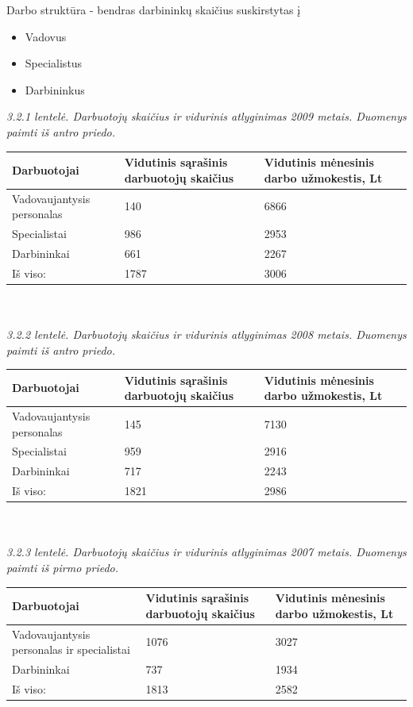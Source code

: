 \documentclass[11pt,a4paper]{article}
\begin{document}
Darbo struktūra - bendras darbininkų skaičius suskirstytas į
\begin{itemize}
	\item Vadovus
	\item Specialistus
	\item Darbininkus
\end{itemize}
\textsl{3.2.1 lentelė. Darbuotojų skaičius ir vidurinis atlyginimas 2009 metais. Duomenys 
paimti iš antro priedo.}\\
\begin{tabular}{|p{5cm}|p{5cm}|p{5cm}|} \hline
	Darbuotojai & Vidutinis sąrašinis darbuotojų skaičius & Vidutinis mėnesinis darbo užmokestis, Lt \\ \hline
	Vadovaujantysis personalas & 140 & 6866 \\ \hline
	Specialistai &	986 & 2953 \\ \hline
	Darbininkai & 661 & 2267 \\ \hline
	Iš viso:	& 1787 & 3006 \\ \hline
\end{tabular}\\\\
\textsl{3.2.2 lentelė. Darbuotojų skaičius ir vidurinis atlyginimas 2008 metais. Duomenys 
paimti iš antro priedo.}\\
\begin{tabular}{|p{5cm}|p{5cm}|p{5cm}|} \hline
	Darbuotojai & Vidutinis sąrašinis darbuotojų skaičius & Vidutinis mėnesinis darbo užmokestis, Lt \\ \hline
	Vadovaujantysis personalas & 145 & 7130 \\ \hline
	Specialistai &	959 & 2916 \\ \hline
	Darbininkai & 717 & 2243 \\ \hline
	Iš viso:	& 1821 & 2986 \\ \hline
\end{tabular}\\\\
\textsl{3.2.3 lentelė. Darbuotojų skaičius ir vidurinis atlyginimas 2007 metais. Duomenys 
paimti iš pirmo priedo.}\\
\begin{tabular}{|p{5cm}|p{5cm}|p{5cm}|} \hline
	Darbuotojai & Vidutinis sąrašinis darbuotojų skaičius & Vidutinis mėnesinis darbo užmokestis, Lt \\ \hline
	Vadovaujantysis personalas ir specialistai & 1076 & 3027 \\ \hline
	Darbininkai & 737 & 1934 \\ \hline
	Iš viso:	& 1813 & 2582 \\ \hline
\end{tabular}\\\\
\end{document}
